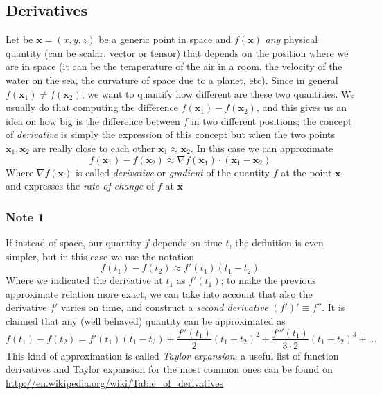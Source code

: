 \subsection{Derivatives}
Let be $\mathbf{x}=(x,y,z)$ be a generic point in space and $f(\mathbf{x})$ \textit{any} physical quantity (can be scalar, vector or tensor) that depends on the position where we are in space (it can be the temperature of the air in a room, the velocity of the water on the sea, the curvature of space due to a planet, etc). Since in general $f(\mathbf{x}_1)\neq f(\mathbf{x}_2)$, we want to quantify how different are these two quantities. We usually do that computing the difference $f(\mathbf{x}_1)-f(\mathbf{x}_2)$, and this gives us an idea on how big is the difference between $f$ in two different positions; the concept of \textit{derivative} is simply the expression of this concept but when the two points $\mathbf{x}_1,\mathbf{x}_2$ are really close to each other $\mathbf{x}_1\approx\mathbf{x}_2$. In this case we can approximate 
\begin{equation}
f(\mathbf{x}_1)-f(\mathbf{x}_2)\approx \nabla f(\mathbf{x}_1)\cdot(\mathbf{x}_1-\mathbf{x}_2)
\end{equation}
Where $\nabla f(\mathbf{x})$ is called \textit{derivative} or \textit{gradient} of the quantity $f$ at the point $\mathbf{x}$ and expresses the \textit{rate of change} of $f$ at $\mathbf{x}$
\subsubsection{Note 1}
If instead of space, our quantity $f$ depends on time $t$, the definition is even simpler, but in this case we use the notation
\begin{equation}
f(t_1)-f(t_2)\approx f'(t_1)(t_1-t_2)
\end{equation}
Where we indicated the derivative at $t_1$ as $f'(t_1)$; to make the previous approximate relation more exact, we can take into account that also the derivative $f'$ varies on time, and construct a \textit{second derivative} $(f')'\equiv f''$. It is claimed that any (well behaved) quantity can be approximated as 
\begin{equation}
f(t_1)-f(t_2)=f'(t_1)(t_1-t_2)+\frac{f''(t_1)}{2}(t_1-t_2)^2+\frac{f'''(t_1)}{3\cdot 2}(t_1-t_2)^3+...
\end{equation}
This kind of approximation is called \textit{Taylor expansion}; a useful list of function derivatives and Taylor expansion for the most common ones can be found on \url{http://en.wikipedia.org/wiki/Table_of_derivatives}
